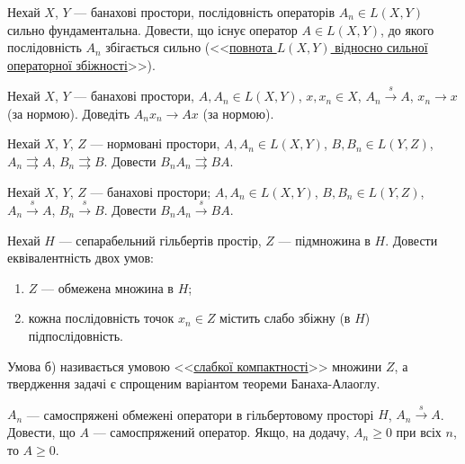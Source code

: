 \begin{exercise}\label{N:1_4_22}
    Нехай $X$, $Y$ --- банахові простори, послідовність операторів $A_n \in L(X,Y)$ сильно
    фундаментальна. Довести, що існує оператор $A \in L(X,Y)$, до якого послідовність $A_n$
    збігається сильно (<<\ul{повнота $L(X,Y)$ відносно сильної операторної збіжності}>>).
\end{exercise}

\begin{exercise}
    Нехай $X$, $Y$ --- банахові простори, $A, A_n \in L(X,Y)$, $x, x_n \in X$,
    $A_n \overset{s}{\to} A$, $x_n \to x$ (за нормою). Доведіть $A_n x_n \to Ax$ (за нормою).
\end{exercise}

\begin{exercise}
    Нехай $X$, $Y$, $Z$ --- нормовані простори, $A, A_n \in L(X,Y)$, $B, B_n \in L(Y,Z)$,
    $A_n \rightrightarrows A$, $B_n \rightrightarrows B$.
    Довести $B_n A_n \rightrightarrows BA$.
\end{exercise}

\begin{exercise}
    Нехай $X$, $Y$, $Z$ --- банахові простори; $A, A_n \in L(X,Y)$, $B, B_n \in L(Y,Z)$,
    $A_n \overset{s}{\to} A$, $B_n \overset{s}{\to} B$.
    Довести $B_n A_n \overset{s}{\to} BA$.
\end{exercise}

\begin{exercise}\label{N:1_4_26}
    Нехай $H$ --- сепарабельний гільбертів простір, $Z$ --- підмножина в $H$.
    Довести еквівалентність двох умов:
    \begin{enumerate}
        \item $Z$ --- обмежена множина в $H$;
        \item кожна послідовність точок $x_n \in Z$ містить слабо збіжну (в $H$) 
        підпослідовність.
    \end{enumerate}
    Умова б) називається умовою <<\uline{слабкої компактності}>> множини $Z$,
    а твердження задачі є спрощеним варіантом теореми Банаха-Алаоглу.
\end{exercise}

\begin{exercise}
    $A_n$ --- самоспряжені обмежені оператори в гільбертовому просторі $H$,
    $A_n \overset{s}{\to} A$. Довести, що $A$ --- самоспряжений оператор.
    Якщо, на додачу, $A_n \geq 0$ при всіх $n$, то $A \geq 0$.
\end{exercise}

